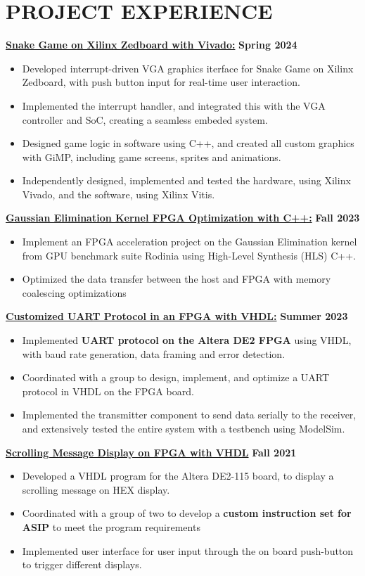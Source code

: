 \documentclass[letterpaper,11pt]{article}
\newcommand{\Item} [1] {
    \item\small{{#1 \vspace{-2pt}}}
}
\newcommand{\resumeItemListStart} [0] {
    \vspace{2pt}
    \begin{itemize}[topsep=0pt,itemsep=-2pt]
}
\newcommand{\resumeItemListEnd} [0] {
    \end{itemize}
    \vspace{5pt}
}
\begin{document}
    \section{PROJECT EXPERIENCE}
    {{\color{colorValue}} \underline{\textbf{Snake Game on Xilinx Zedboard with Vivado:}}} \hfill \textbf{Spring 2024}
    \resumeItemListStart{}
        \Item{Developed interrupt-driven VGA graphics iterface for Snake Game on Xilinx Zedboard, with push button input for real-time user interaction.}
        \Item{Implemented the interrupt handler, and integrated this with the VGA controller and SoC, creating a seamless embeded system.}
        \Item{Designed game logic in software using C++, and created all custom graphics with GiMP, including game screens, sprites and animations.}
        \Item{Independently designed, implemented and tested the hardware, using Xilinx Vivado, and the software, using Xilinx Vitis.}
    \resumeItemListEnd{}
    {{\color{colorValue}} \underline{\textbf{Gaussian Elimination Kernel FPGA Optimization with C++:}}} \hfill \textbf{Fall 2023}
    \resumeItemListStart{}
        \Item{Implement an FPGA acceleration project on the Gaussian Elimination kernel from GPU benchmark suite Rodinia using High-Level Synthesis (HLS) C++.}
        \Item{Optimized the data transfer between the host and FPGA with memory coalescing optimizations}
    \resumeItemListEnd{}
    {{\color{colorValue}} \underline{\textbf{Customized UART Protocol in an FPGA with VHDL:}}} \hfill \textbf{Summer 2023}
    \resumeItemListStart{}
        \Item{Implemented \textbf{UART protocol on the Altera DE2 FPGA} using VHDL, with baud rate generation, data framing and error detection.}
        \Item{Coordinated with a group to design, implement, and optimize a UART protocol in VHDL on the FPGA board.}
        \Item{Implemented the transmitter component to send data serially to the receiver, and extensively tested the entire system with a testbench using ModelSim.}
    \resumeItemListEnd{}
    {{\color{colorValue}} \underline{\textbf{Scrolling Message Display on FPGA with VHDL}}} \hfill \textbf{Fall 2021}
    \resumeItemListStart{}
        \Item{Developed a VHDL program for the Altera DE2-115 board, to display a scrolling message on HEX display.}
        \Item{Coordinated with a group of two to develop a \textbf{custom instruction set for ASIP} to meet the program requirements}
        \Item{Implemented user interface for user input through the on board push-button to trigger different displays.}
    \resumeItemListEnd{}
\end{document}
